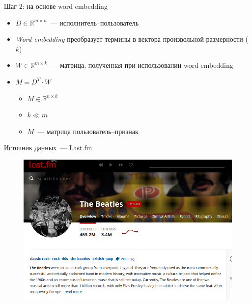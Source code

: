 \documentclass{beamer}
\begin{document}
\begin{frame}{Шаг 2: на основе word embedding}
  \begin{itemize}
      \item {$D \in \mathbb{R}^{m \times n}$~--- исполнитель--пользователь}
      \item {\textit{Word embedding} преобразует термины в вектора произвольной размерности ($k$)}
      \item {$W \in \mathbb{R}^{m \times k}$~--- матрица, полученная при использовании word embedding}
      \item {$M = D^T \cdot W$}
      \begin{itemize}
          \item {$M \in \mathbb{R}^{n \times k}$}
          \item {$k \ll m$}
          \item {$M$~--- матрица пользователь--признак}
      \end{itemize}
  \end{itemize}
\end{frame}

\begin{frame}{Источник данных~--- Last.fm}
    \begin{figure}
        \includegraphics[width=\textwidth]{figures/lastfm.png}
    \end{figure}
\end{frame}
\end{document}

